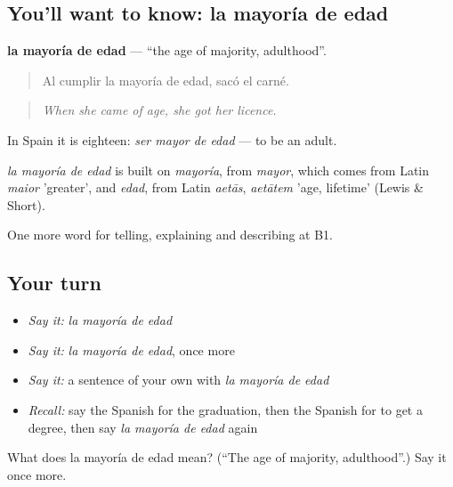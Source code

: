 \subsection*{You'll want to know: la mayoría de edad}
\textbf{la mayoría de edad} — \textquotedblleft{}the age of majority, adulthood\textquotedblright{}.

\begin{quote}
Al cumplir la mayoría de edad, sacó el carné.
\end{quote}

\begin{quote}
\emph{When she came of age, she got her licence.}
\end{quote}

In Spain it is eighteen: \emph{ser mayor de edad} — to be an adult.

\begin{cousinweb}
\emph{la mayoría de edad} is built on \emph{mayoría}, from \emph{mayor}, which comes from Latin \emph{maior} 'greater', and \emph{edad}, from Latin \emph{aetās}, \emph{aetātem} 'age, lifetime' (Lewis \& Short).
\end{cousinweb}

\begin{grammarlens}[title={What you've built}]
One more word for telling, explaining and describing at B1.
\end{grammarlens}

\subsection*{Your turn}
\begin{itemize}
\raggedright
  \item \emph{Say it:} \emph{la mayoría de edad}
  \item \emph{Say it:} \emph{la mayoría de edad}, once more
  \item \emph{Say it:} a sentence of your own with \emph{la mayoría de edad}
  \item \emph{Recall:} say the Spanish for the graduation, then the Spanish for to get a degree, then say \emph{la mayoría de edad} again
\end{itemize}

\begin{tcolorbox}[breakable,colback=teal!4,colframe=teal!35!black,title={Before you move on}]
What does la mayoría de edad mean? (\textquotedblleft{}The age of majority, adulthood\textquotedblright{}.) Say it once more.
\end{tcolorbox}

